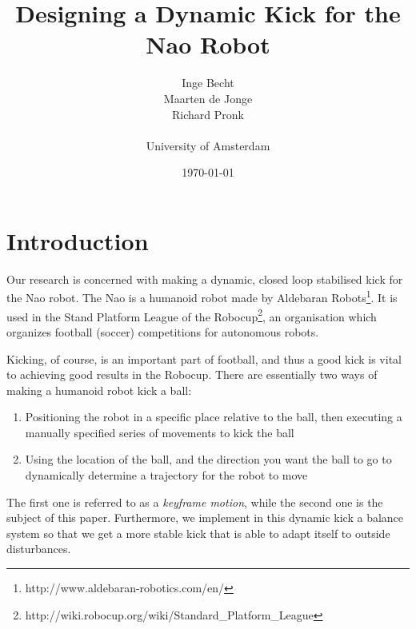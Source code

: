 \documentclass[a4paper]{article}
\begin{document}
\newcommand{\bvect}[1] {\begin{bmatrix} #1 \end{bmatrix}}
\newcommand{\pvect}[1] {\begin{pmatrix} #1 \end{pmatrix}}

\title{Designing a Dynamic Kick for the Nao Robot}
\author{ Inge Becht \\ 
         Maarten de Jonge \\ 
         Richard Pronk \\\\
         \large{University of Amsterdam}}
\date{\today}
\maketitle

\newenvironment{changemargin}[2]{%
\begin{list}{}{%
\setlength{\topsep}{0pt}%
\setlength{\leftmargin}{#1}%
\setlength{\rightmargin}{#2}%
\setlength{\listparindent}{\parindent}%
\setlength{\itemindent}{\parindent}%
\setlength{\parsep}{\parskip}%
}%
\item[]}{\end{list}}

\section{Introduction} 
Our research is concerned with making a dynamic, closed
loop stabilised kick for the Nao robot. The Nao is a humanoid robot made by
Aldebaran Robots\footnote{http://www.aldebaran-robotics.com/en/}. It is used in
the Stand Platform League of the
Robocup\footnote{http://wiki.robocup.org/wiki/Standard\_Platform\_League}, an organisation which organizes football (soccer)
competitions for autonomous robots.

Kicking, of course, is an important part of football, and thus a good kick is vital to achieving good results in the Robocup. There are essentially two ways of making a humanoid robot kick a ball:
\begin{enumerate}
  \item Positioning the robot in a specific place relative to the ball, then
      executing a manually specified series of movements to kick the ball
  \item Using the location of the ball, and the direction you want the ball to
      go to dynamically determine a trajectory for the robot to move
\end{enumerate}
The first one is referred to as a \emph{keyframe motion}, while the second one
is the subject of this paper. Furthermore, we implement in this dynamic kick a
balance system so that we get a more stable kick that is able to adapt itself to
outside disturbances.
\end{document}
